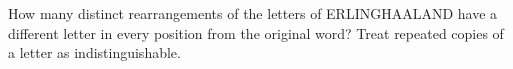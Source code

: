 How many distinct rearrangements of the letters of ERLINGHAALAND have a different letter in every position from the original word? Treat repeated copies of a letter as indistinguishable.

